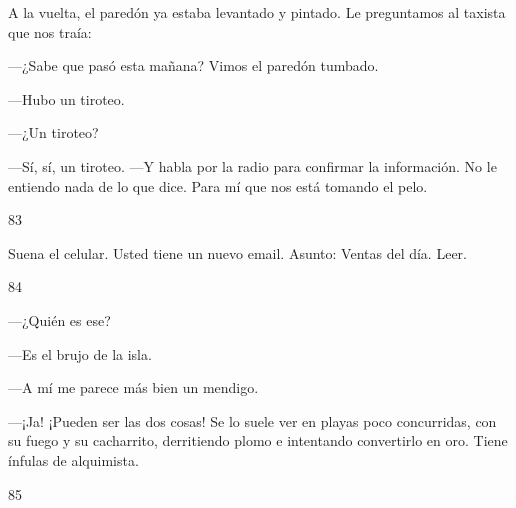 \documentclass[12pt,twoside,openright,a5paper]{book}
\begin{document}
A la vuelta, el paredón ya estaba levantado y pintado. Le preguntamos
al taxista que nos traía:

---¿Sabe que pasó esta mañana? Vimos el paredón tumbado.

---Hubo un tiroteo.

---¿Un tiroteo?

---Sí, sí, un tiroteo. ---Y
habla por la radio para confirmar la información. No le entiendo nada de
lo que dice. Para mí que nos está tomando el pelo.

\vspace{0.5cm}

\hrulefill \hspace{0.1cm}\decofourleft\hspace{0.2cm} 83 \hspace{0.2cm}\decofourright \hspace{0.1cm}\hrulefill

\nopagebreak

\vspace{0.5cm}

\nopagebreak

Suena el celular. Usted tiene un nuevo email. Asunto: Ventas del día. Leer.

\vspace{0.5cm}

\hrulefill \hspace{0.1cm}\decofourleft\hspace{0.2cm} 84 \hspace{0.2cm}\decofourright \hspace{0.1cm}\hrulefill

\nopagebreak

\vspace{0.5cm}

\nopagebreak

---¿Quién es ese?

---Es el brujo de la isla.

---A mí me parece más bien un mendigo.

---¡Ja! ¡Pueden ser las dos cosas! Se lo suele ver en playas poco concurridas,
con su fuego y su cacharrito, derritiendo plomo e intentando convertirlo
en oro.  Tiene ínfulas de alquimista.

\vspace{0.5cm}

\hrulefill \hspace{0.1cm}\decofourleft\hspace{0.2cm} 85 \hspace{0.2cm}\decofourright \hspace{0.1cm}\hrulefill
\end{document}
